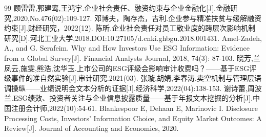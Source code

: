 \documentclass[12pt,a4paper]{article}
\begin{document}
\begin{thebibliography}{99}
     顾雷雷,郭建鸾,王鸿宇.企业社会责任、融资约束与企业金融化[J].金融研究,2020,No.476(02):109-127.
     邓博夫，陶存杰，吉利.企业参与精准扶贫与缓解融资约束[J].财经研究，2022(12).
     陈昕.企业社会责任对员工敬业度的跨层次影响机制研究[D].河北工业大学,2018.DOI:10.27105/d.cnki.ghbgu.2018.001431.
     Amel-Zadeh, A., and G. Serafeim. Why and How Investors Use ESG Information: Evidence from a Global Survey[J]. Financial Analysts Journal, 2018, 74(3): 87-103.
     晓芳,兰凤云,施雯,熊浩,沈华玉.上市公司的ESG评级会影响审计收费吗？——基于ESG评级事件的准自然实验[J].审计研究.2021(03).
     张璇,胡婧,李春涛.卖空机制与管理层语调操纵——业绩说明会文本分析的证据[J].经济科学,2022(04):138-153.
     谢诗蕾,周波兰.ESG绩效、投资者关注与企业信息披露质量——基于年报文本挖掘的分析[J].中国注册会计师,2022(10):54-61.
     Blankespoor E, Dehaan E, Marinovic I. Disclosure Processing Costs, Investors' Information Choice, and Equity Market Outcomes: A Review[J]. Journal of Accounting and Economics, 2020.
\end{thebibliography}
\end{document}
